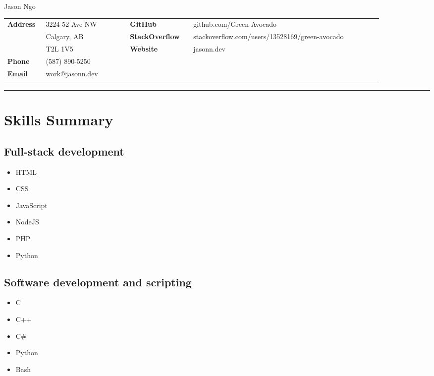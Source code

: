 \documentclass[letterpaper]{article}
\begin{document}
    \begin{center}
        \Large
        Jason Ngo
    \end{center}

    \small{%
        \renewcommand{\arraystretch}{1.5}
        \begin{tabular}{p{0.08\linewidth} p{0.2\linewidth} p{0.15\linewidth} p{0.45\linewidth}}
            \textbf{Address} & 3224 52 Ave NW & \textbf{GitHub} & github.com/Green-Avocado \\
            & Calgary, AB & \textbf{StackOverflow} & stackoverflow.com/users/13528169/green-avocado \\
            & T2L 1V5 & \textbf{Website} & jasonn.dev \\
            \textbf{Phone} & (587) 890-5250 \\
            \textbf{Email} & work@jasonn.dev \\
            \\
        \end{tabular}
    }

    \rule{\linewidth}{0.4pt}

    \section*{Skills Summary}
        \subsection*{Full-stack development}

        \begin{itemize}
            \item HTML
            \item CSS
            \item JavaScript
            \item NodeJS
            \item PHP
            \item Python
        \end{itemize}

        \subsection*{Software development and scripting}

        \begin{itemize}
            \item C
            \item C++
            \item C\#
            \item Python
            \item Bash
        \end{itemize}
\end{document}
